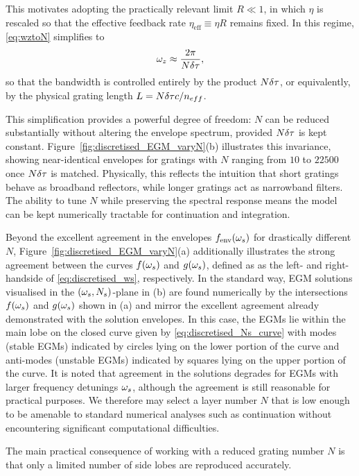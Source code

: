 This motivates adopting the practically relevant limit $R\ll1$, in which $\eta$ is rescaled so that the effective feedback rate $\eta_\text{eff} \equiv \eta R$ remains fixed. 
In this regime, \eqref{eq:wztoN} simplifies to
%
\begin{equation}
\label{eq:wz_approx}
\omega_z \approx \frac{2\pi}{N \delta \tau},
\end{equation}
%
so that the bandwidth is controlled entirely by the product $N\delta \tau$, or equivalently, by the physical grating length $L = N \delta \tau c/n_{eff}$.
%
\par
%
This simplification provides a powerful degree of freedom: $N$ can be reduced substantially without altering the envelope spectrum, provided $N\delta \tau$ is kept constant.
Figure~\ref{fig:discretised_EGM_varyN}(b) illustrates this invariance, showing near-identical envelopes for gratings with $N$ ranging from $10$ to $22500$ once $N\delta \tau$ is matched.
Physically, this reflects the intuition that short gratings behave as broadband reflectors, while longer gratings act as narrowband filters.
The ability to tune $N$ while preserving the spectral response means the model can be kept numerically tractable for continuation and integration.
%
\par
%
Beyond the excellent agreement in the envelopes $f_\text{env}(\omega_s)$ for drastically different $N$, Figure~\ref{fig:discretised_EGM_varyN}(a) additionally illustrates the strong agreement between the curves $f(\omega_s)$ and $g(\omega_s)$, defined as as the left- and right-handside of \eqref{eq:discretised_ws}, respectively.
In the standard way, EGM solutions visualised in the $(\omega_s, N_s)$-plane in (b) are found numerically by the intersections $f(\omega_s)$ and $g(\omega_s)$ shown in (a) and mirror the excellent agreement already demonstrated with the solution envelopes.
In this case, the EGMs lie within the main lobe on the closed curve given by \eqref{eq:discretised_Ns_curve} with modes (stable EGMs) indicated by circles lying on the lower portion of the curve and anti-modes (unstable EGMs) indicated by squares lying on the upper portion of the curve.
It is noted that agreement in the solutions degrades for EGMs with larger frequency detunings $\omega_s$, although the agreement is still reasonable for practical purposes.
We therefore may select a layer number $N$ that is low enough to be amenable to standard numerical analyses such as continuation without encountering significant computational difficulties.
%
\par
%
The main practical consequence of working with a reduced grating number $N$ is that only a limited number of side lobes are reproduced accurately.  

